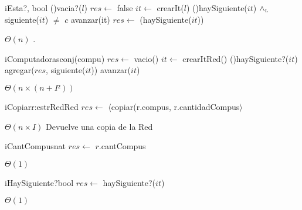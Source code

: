 \begin{Algoritmos}
  \begin{algoritmo}{iEsta?}{, }{bool}
    \eIf(){vacia?($l$)}{
      $res \gets$ false
    }{
     $it \gets$ crearIt($l$)
      \While(){haySiguiente($it$) $\land_{\mathrm{\scriptscriptstyle{L}}}$ siguiente($it$) $\neq$ $c$}{
        avanzar(it)
      }
    }
    $res \gets$ (haySiguiente($it$))
  \end{algoritmo}
  {} %
  {} %
  {$\Theta(n)$} %
  {.} %

  \begin{algoritmo}{iComputadoras}{}{conj(compu)}{}
    $res \gets$ vacio()
     $it \gets$ crearItRed()
    \While(){haySiguiente?($it$)}{
      agregar($res$, siguiente($it$))
      avanzar($it$)
    }
  \end{algoritmo}
  \datosAlgoritmo{} %
  {} %
  {} %
  {$\Theta(n \times (n+I²))$} %
  {} %
   
   \begin{algoritmo}{iCopiar}{\In r:estrRed}{Red}
   	$res \gets$ $\langle$copiar(r.compus, r.cantidadCompus$\rangle$
   \end{algoritmo}
  \datosAlgoritmo{} %
  {} %
  {} %
  {$\Theta(n \times I)$} %
  {Devuelve una copia de la Red} %

   \begin{algoritmo}{iCantCompus}{}{nat}
    $res \gets$ $r$.cantCompus
   \end{algoritmo}   
  \datosAlgoritmo{} %
  {} %
  {} %
  {$\Theta(1)$} %
  {} %


  \begin{algoritmo}{iHaySiguiente?}{}{bool}{}
  $res \gets$ haySiguiente?($it$)
  \end{algoritmo}
  \datosAlgoritmo{} %
  {} %
  {} %
  {$\Theta(1)$} %
  {} %


\end{Algoritmos}
